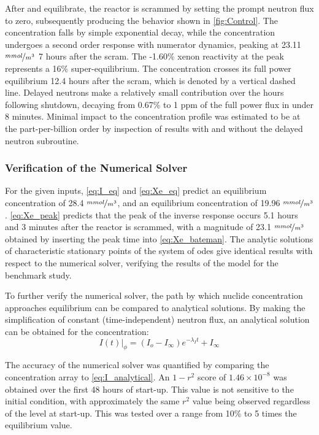 After \I and \Xe equilibrate, the reactor is scrammed by setting the prompt neutron flux to zero, subsequently producing the behavior shown in  \cref{fig:Control}. The \I concentration falls by simple exponential decay, while the \Xe concentration undergoes a second order response with numerator dynamics, peaking at 23.11 $\nicefrac{mmol}{m^3}$ 7 hours after the scram. The -1.60\% xenon reactivity at the peak represents a 16\% super-equilibrium. The \Xe concentration crosses its full power equilibrium 12.4 hours after the scram, which is denoted by a vertical dashed line. Delayed neutrons make a relatively small contribution over the hours following shutdown, decaying from 0.67\% to 1 ppm of the full power flux in under 8 minutes. Minimal impact to the \Xe concentration profile was estimated to be at the part-per-billion order by inspection of results with and without the delayed neutron subroutine.

\subsubsection{Verification of the Numerical Solver} 
For the given inputs, \ref{eq:I_eq} and \ref{eq:Xe_eq} predict an equilibrium \I concentration of 28.4 $\nicefrac{mmol}{m^3}$, and an equilibrium \Xe concentration of 19.96 $\nicefrac{mmol}{m^3}$. \ref{eq:Xe_peak} predicts that the peak of the inverse response occurs 5.1 hours and 3 minutes after the reactor is scrammed, with a magnitude of 23.1 $\nicefrac{mmol}{m^3}$ obtained by inserting the peak time into \ref{eq:Xe_bateman}. The analytic solutions of characteristic stationary points of the system of \acsp{ode} give identical results with respect to the numerical solver, verifying the results of the model for the benchmark study.

To further verify the numerical solver, the path by which nuclide concentration approaches equilibrium can be compared to analytical solutions. By making the simplification of constant (time-independent) neutron flux, an analytical solution can be obtained for the \I concentration:
\begin{equation}\label{eq:I_analytical}
\left.I(t)\right\rvert_\phi = (I_o-I_\infty)e^{-\lambda_I t}+I_\infty
\end{equation}

The accuracy of the numerical solver was quantified by comparing the \I concentration array to \ref{eq:I_analytical}. An $1-r^2$ score of $1.46\times10^{-8}$ was obtained over the first 48 hours of start-up. This value is not sensitive to the initial condition, with approximately the same $r^2$ value being observed regardless of the \I level at start-up. This was tested over a range from 10\% to 5 times the equilibrium value.

